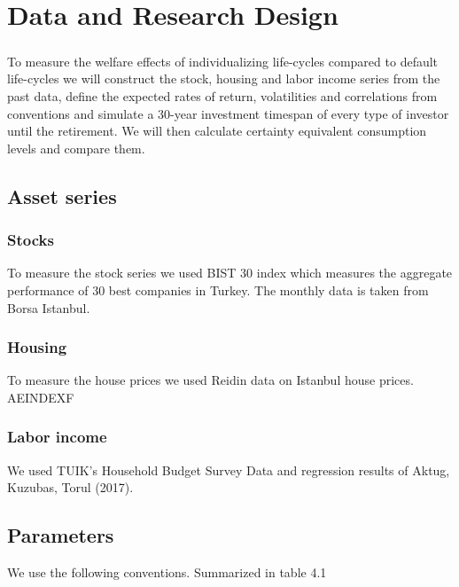 \chapter{Data and Research Design}
\label{data}

\paragraph*{}To measure the welfare effects of individualizing life-cycles compared to default life-cycles we will construct the stock, housing and labor income series from the past data, define the expected rates of return, volatilities and correlations from conventions and simulate a 30-year investment timespan of every type of investor until the retirement. We will then calculate certainty equivalent consumption levels and compare them. 

\section{Asset series}

\subsection{Stocks}
To measure the stock series we used BIST 30 index which measures the aggregate performance of 30 best companies in Turkey. The monthly data is taken from Borsa Istanbul.

\subsection{Housing}
To measure the house prices we used Reidin data on Istanbul house prices. AEINDEXF

\subsection{Labor income}
We used TUIK's Household Budget Survey Data and regression results of Aktug, Kuzubas, Torul (2017).



\section{Parameters}
We use the following conventions. Summarized in table 4.1
